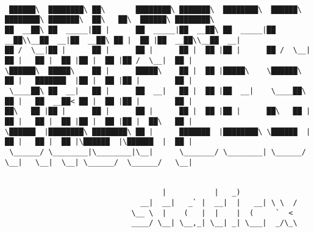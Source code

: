 \documentclass[varwidth=\maxdimen,margin=0.5cm,multi={verbatim}]{standalone}
\begin{document}
\begin{verbatim}

 ██████\  ████████\ ██\       ████████\ ███████\  ████████\  ██████\ ████████\ ███████\  ██\   ██\  ██████\ ████████\
██  __██\ ██  _____|██ |      ██  _____|██  __██\ ██  _____|██  __██\\__██  __|██  __██\ ██ |  ██ |██  __██\\__██  __|
██ /  \__|██ |      ██ |      ██ |      ██ |  ██ |██ |      ██ /  \__|  ██ |   ██ |  ██ |██ |  ██ |██ /  \__|  ██ |
\██████\  █████\    ██ |      █████\    ██ |  ██ |█████\    \██████\    ██ |   ███████  |██ |  ██ |██ |        ██ |
 \____██\ ██  __|   ██ |      ██  __|   ██ |  ██ |██  __|    \____██\   ██ |   ██  __██< ██ |  ██ |██ |        ██ |
██\   ██ |██ |      ██ |      ██ |      ██ |  ██ |██ |      ██\   ██ |  ██ |   ██ |  ██ |██ |  ██ |██ |  ██\   ██ |
\██████  |████████\ ████████\ ██ |      ███████  |████████\ \██████  |  ██ |   ██ |  ██ |\██████  |\██████  |  ██ |
 \______/ \________|\________|\__|      \_______/ \________| \______/   \__|   \__|  \__| \______/  \______/   \__|


                                    |           |   _)
                               __|  __|   _` |  __|  |   __| \ \  /
                             \__ \  |    (   |  |    |  (     `  <
                             ____/ \__| \__,_| \__| _| \___|  _/\_\



\end{verbatim}
\end{document}
